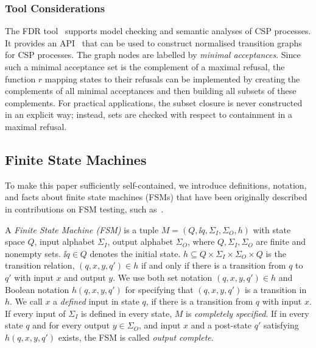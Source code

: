 \subsubsection*{Tool Considerations}
The FDR tool~\cite{fdr} supports model checking and semantic analyses of CSP processes.
It provides an API~\cite{fdrmanual} that can be used to construct normalised transition graphs for CSP processes. The graph  nodes are labelled by \emph{minimal acceptances}. Since such a minimal acceptance set is the complement of a maximal refusal, the function $r$ mapping states
to their refusals can be implemented by creating the complements of all minimal acceptances
and then building all subsets of these complements. For practical applications,
the subset closure is never constructed in an explicit way; instead, sets are checked
with respect to containment in a maximal refusal.

%




\subsection{Finite State Machines}


To make this paper sufficiently self-contained, we introduce definitions, notation, and facts
about
finite state machines (FSMs) that have been originally described in contributions on FSM testing, such as~\cite{petrenko_testing_2011,DBLP:conf/hase/PetrenkoY14,hierons_testing_2004}.

A \emph{Finite State Machine (FSM)} is  a tuple
 $M=(Q, \ii{q}, \Sigma_I, \Sigma_O,  h)$   with state space $Q$, input alphabet $\Sigma_I$,
 output alphabet $\Sigma_O$, where $Q,\Sigma_I,\Sigma_O$ are finite and nonempty sets. $\ii{q}\in Q$ denotes the initial state.
$h\subseteq Q\times \Sigma_I \times \Sigma_O\times Q$ is the  transition relation,  $(q,x,y,q')\in h$ if and only if there is a transition from $q$ to $q'$ with input $x$ and output $y$.
We use  both set notation $(q,x,y,q')\in h$ and Boolean notation $h(q,x,y,q')$ for specifying
that $(q,x,y,q')$ is a transition in $h$.
We call $x$ a \emph{defined} input in state $q$, if there is a transition from $q$  with input $x$.
If every input of $\Sigma_I$ is defined in every state, $M$ is \emph{completely specified}.
If in every state $q$ and for every output $y\in\Sigma_O$, and input $x$ and a post-state
$q'$ satisfying $h(q,x,y,q')$ exists, the FSM is called \emph{output complete}.


